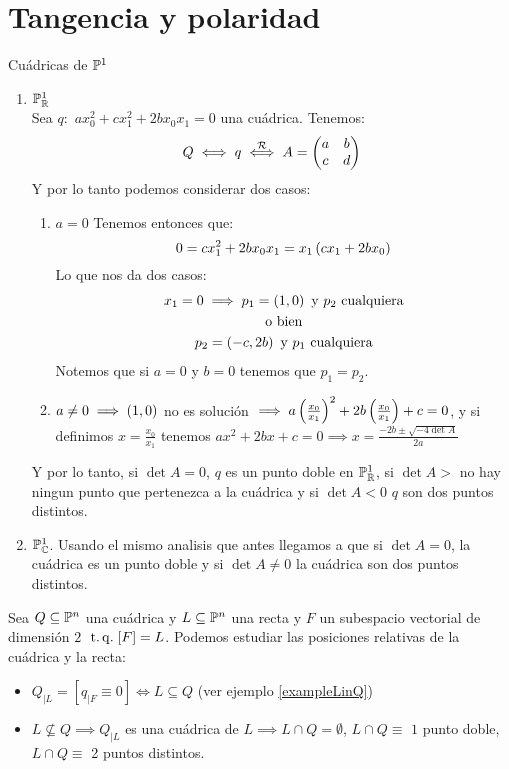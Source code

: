 \section{Tangencia y polaridad}

\begin{example} Cuádricas de $\mathbb{P}^1$
   \begin{enumerate}
      \item $\mathbb{P}^1_{\mathbb{R}}$\\
      Sea $q:$ $ax^{2}_{0} + cx^{2}_{1}+2bx_0x_1=0$ una cuádrica. Tenemos:
      \[
	Q \iff q \stackrel{\mathcal{R}}{\iff}A=
      \begin{pmatrix}
	a & b\\
	c & d\\
      \end{pmatrix}
      \]
      Y por lo tanto podemos considerar dos casos:
      \begin{enumerate}
	\item $a=0$ Tenemos entonces que:
	\[
	  0=cx^{2}_{1}+2bx_0x_1 = x_1 \left( cx_1 +2bx_0 \right) 
	\]
	Lo que nos da dos casos:
	\begin{gather*}
	  x_1=0 \implies p_1=\left( 1,0\right) \text{ y $p_2$ cualquiera}\\
	  \text{o bien}\\
	  p_2=\left( -c,2b\right) \text{ y $p_1$ cualquiera}\\
	\end{gather*}
	Notemos que si $a=0$ y $b=0$ tenemos que $p_1=p_2$.
	
	\item $a\neq 0 \implies \left( 1,0\right)$ no es solución 
	$\implies a\left(\frac{x_0}{x_1}\right) ^2 +2b\left(\frac{x_0}{x_1}\right) +c=0$,
	y si definimos $x=\frac{x_0}{x_1}$ tenemos $ax^2 +2bx+c=0 \implies
	x=\frac{-2b \pm \sqrt{-4\det A}}{2a}$\\
      \end{enumerate}
      Y por lo tanto, si $\det A = 0$, $q$ es un punto doble en $\mathbb{P}^1_{\mathbb{R}}$,
      si $\det A>$ no hay ningun punto que pertenezca a la cuádrica y si 
      $\det A <0$ $q$ son dos puntos distintos.
      
      \item $\mathbb{P}^1_\mathbb{C}$. Usando el mismo analisis que antes llegamos a que si
      $\det A=0$, la cuádrica es un punto doble y si $\det A \neq 0$ la cuádrica 
      son dos puntos distintos.
   \end{enumerate}
\end{example}
\begin{obs}
  Sea $Q\subseteq \mathbb{P}^n$ una cuádrica y $L\subseteq \mathbb{P}^n$ una recta y $F$ un subespacio 
  vectorial de dimensión $2$ $\operatorname{\;t.q.\;} [F]=L$. Podemos estudiar las posiciones relativas
  de la cuádrica y la recta:
  \begin{itemize}
   \item $Q_{|L}=\left[ q_{|F} \equiv 0\right] \iff L\subseteq Q$ (ver ejemplo \ref{exampleLinQ})
   \item $L\not\subseteq Q \implies Q_{|L}$ es una cuádrica de $L \implies L\cap 
   Q = \emptyset$, $L\cap Q\equiv$ $1$ punto doble, $L\cap Q\equiv$ 2 puntos distintos.
  \end{itemize}
\end{obs}
